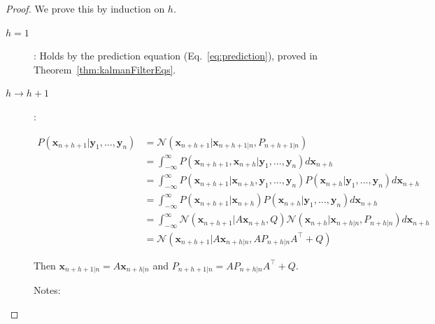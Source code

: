 \documentclass[12pt]{article}
\begin{document}
\begin{proof}
    We prove this by induction on $h$.

    \begin{description}
        \item[$h=1$]: Holds by the prediction equation
            (Eq.~\ref{eq:prediction}), proved in
            Theorem~\ref{thm:kalmanFilterEqs}.

        \item[$h\rightarrow h+1$]:

            \begin{align*}
                P(\mathbf{x}_{n+h+1}|\mathbf{y}_1,\ldots,\mathbf{y}_{n})&=\mathcal{N}(\mathbf{x}_{n+h+1}|\mathbf{x}_{n+h+1|n},P_{n+h+1|n})\\
                                                                      &=\int_{-\infty}^\infty
                                                                      P(\mathbf{x}_{n+h+1},\mathbf{x}_{n+h}|\mathbf{y}_1,\ldots,\mathbf{y}_{n})d\mathbf{x}_{n+h}\\
                                                                      &=\int_{-\infty}^\infty
                                                                      P(\mathbf{x}_{n+h+1}|\mathbf{x}_{n+h},\mathbf{y}_1,\ldots,\mathbf{y}_{n})P(\mathbf{x}_{n+h}|\mathbf{y}_1,\ldots,\mathbf{y}_{n})d\mathbf{x}_{n+h}\\
                                                                      &=\int_{-\infty}^\infty
                                                                      P(\mathbf{x}_{n+h+1}|\mathbf{x}_{n+h})P(\mathbf{x}_{n+h}|\mathbf{y}_1,\ldots,\mathbf{y}_{n})d\mathbf{x}_{n+h}\\
                                                                      &=\int_{-\infty}^\infty
                                                                      \mathcal{N}(\mathbf{x}_{n+h+1}|A\mathbf{x}_{n+h},Q)\mathcal{N}(\mathbf{x}_{n+h}|\mathbf{x}_{n+h|n},P_{n+h|n})d\mathbf{x}_{n+h}\\
                                                                      &=\mathcal{N}(\mathbf{x}_{n+h+1}|A\mathbf{x}_{n+h|n},AP_{n+h|n}A^\intercal+Q)
            \end{align*}

            Then $\mathbf{x}_{n+h+1|n}=A\mathbf{x}_{n+h|n}$ and
            $P_{n+h+1|n}=AP_{n+h|n}A^\intercal+Q$.

            Notes:

            \begin{enumerate}


\end{enumerate}
\end{description}
\end{proof}
\end{document}
